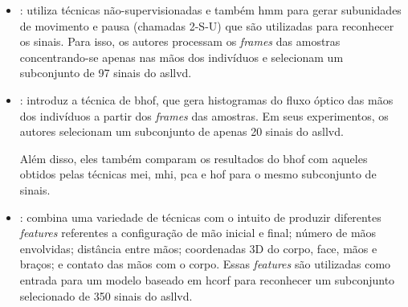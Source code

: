 \begin{itemize}

      \item \textbf{}: utiliza técnicas não-supervisionadas e também \acrfull{hmm} para gerar subunidades de movimento e pausa (chamadas 2-S-U) que são utilizadas para reconhecer os sinais.
            Para isso, os autores processam os \textit{frames} das amostras concentrando-se apenas nas mãos dos indivíduos e selecionam um subconjunto de 97 sinais do \acrshort{asllvd}.

      \item \textbf{}: introduz a técnica de \acrfull{bhof}, que gera histogramas do fluxo óptico das mãos dos indivíduos a partir dos \textit{frames} das amostras.
            Em seus experimentos, os autores selecionam um subconjunto de apenas 20 sinais do \acrshort{asllvd}.

            Além disso, eles também comparam os resultados do \acrshort{bhof} com aqueles obtidos pelas técnicas \acrfull{mei}, \acrfull{mhi}, \acrfull{pca} e \acrfull{hof} para o mesmo subconjunto de sinais.

      \item \textbf{}: combina uma variedade de técnicas com o intuito de produzir diferentes \textit{features} referentes a configuração de mão inicial e final; número de mãos envolvidas; distância entre mãos; coordenadas 3D do corpo, face, mãos e braços; e contato das mãos com o corpo.
            Essas \textit{features} são utilizadas como entrada para um modelo baseado em \acrfull{hcorf} para reconhecer um subconjunto selecionado de 350 sinais do \acrshort{asllvd}.


\end{itemize}
